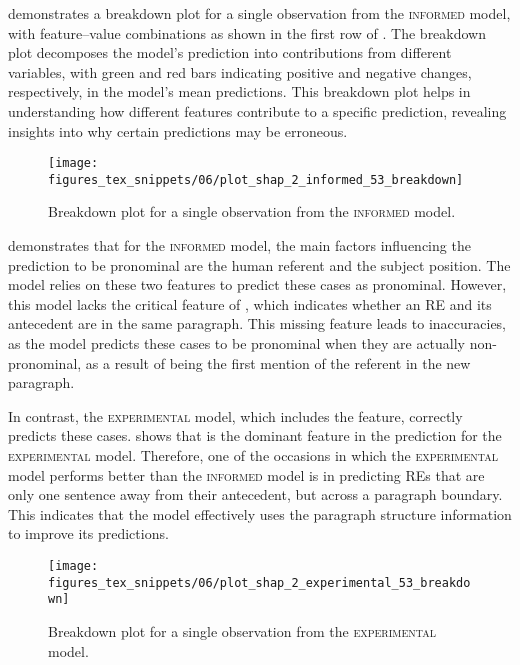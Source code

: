 {\renewcommand\normalsize{\footnotesize}%
	\normalsize
	}


 demonstrates a breakdown plot for a single observation from the \textsc{informed} model, with feature--value combinations as shown in the first row of . The breakdown plot decomposes the model's prediction into contributions from different variables, with green and red bars indicating positive and negative changes, respectively, in the model's mean predictions. This breakdown plot helps in understanding how different features contribute to a specific prediction, revealing insights into why certain predictions may be erroneous. 

\begin{figure}
	\centering
	\texttt{[image: figures\_tex\_snippets/06/plot\_shap\_2\_informed\_53\_breakdown]}
	\caption{Breakdown plot for a single observation from the \textsc{informed} model.}
	\label{fig:plotshap2informed53breakdown}
\end{figure}


 demonstrates that for the \textsc{informed} model, the main factors influencing the prediction to be pronominal are the human referent and the subject position. The model relies on these two features to predict these cases as pronominal. However, this model lacks the critical feature of , which indicates whether an RE and its antecedent are in the same paragraph. This missing feature leads to inaccuracies, as the model predicts these cases to be pronominal when they are actually non-pronominal, as a result of being the first mention of the referent in the new paragraph.

In contrast, the \textsc{experimental} model, which includes the  feature, correctly predicts these cases.  shows that  is the dominant feature in the prediction for the \textsc{experimental} model. Therefore, one of the occasions in which the \textsc{experimental} model performs better than the \textsc{informed} model is in predicting REs that are only one sentence away from their antecedent, but across a paragraph boundary. This indicates that the model effectively uses the paragraph structure information to improve its predictions.

\begin{figure}
	\centering
	\texttt{[image: figures\_tex\_snippets/06/plot\_shap\_2\_experimental\_53\_breakdown]}
	\caption{Breakdown plot for a single observation from the \textsc{experimental} model.}
	\label{fig:plotshap2experimental53breakdown}
\end{figure}


